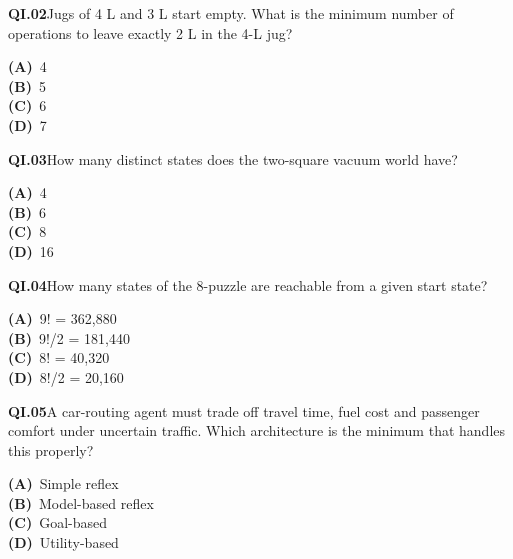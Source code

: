 \documentclass[11pt]{article}
\begin{document}
\begin{tcolorbox}[enhanced,breakable,colback=white,colframe=navyL,arc=2mm,boxrule=0.7pt,left=3mm,right=3mm,top=2mm,bottom=2mm]
\textbf{\color{navy}QI.02}\quad Jugs of 4 L and 3 L start empty. What is the minimum number of operations to leave exactly 2 L in the 4-L jug?\hfill{}\par\smallskip
{\small \textbf{\color{navyL}(A)}\ 4\\[1pt]\textbf{\color{navyL}(B)}\ 5\\[1pt]\textbf{\color{navyL}(C)}\ 6\\[1pt]\textbf{\color{navyL}(D)}\ 7}
\end{tcolorbox}
\begin{tcolorbox}[enhanced,breakable,colback=white,colframe=navyL,arc=2mm,boxrule=0.7pt,left=3mm,right=3mm,top=2mm,bottom=2mm]
\textbf{\color{navy}QI.03}\quad How many distinct states does the two-square vacuum world have?\hfill{}\par\smallskip
{\small \textbf{\color{navyL}(A)}\ 4\\[1pt]\textbf{\color{navyL}(B)}\ 6\\[1pt]\textbf{\color{navyL}(C)}\ 8\\[1pt]\textbf{\color{navyL}(D)}\ 16}
\end{tcolorbox}
\begin{tcolorbox}[enhanced,breakable,colback=white,colframe=navyL,arc=2mm,boxrule=0.7pt,left=3mm,right=3mm,top=2mm,bottom=2mm]
\textbf{\color{navy}QI.04}\quad How many states of the 8-puzzle are reachable from a given start state?\hfill{}\par\smallskip
{\small \textbf{\color{navyL}(A)}\ 9! = 362,880\\[1pt]\textbf{\color{navyL}(B)}\ 9!/2 = 181,440\\[1pt]\textbf{\color{navyL}(C)}\ 8! = 40,320\\[1pt]\textbf{\color{navyL}(D)}\ 8!/2 = 20,160}
\end{tcolorbox}
\begin{tcolorbox}[enhanced,breakable,colback=white,colframe=navyL,arc=2mm,boxrule=0.7pt,left=3mm,right=3mm,top=2mm,bottom=2mm]
\textbf{\color{navy}QI.05}\quad A car-routing agent must trade off travel time, fuel cost and passenger comfort under uncertain traffic. Which architecture is the minimum that handles this properly?\hfill{}\par\smallskip
{\small \textbf{\color{navyL}(A)}\ Simple reflex\\[1pt]\textbf{\color{navyL}(B)}\ Model-based reflex\\[1pt]\textbf{\color{navyL}(C)}\ Goal-based\\[1pt]\textbf{\color{navyL}(D)}\ Utility-based}
\end{tcolorbox}
\end{document}
